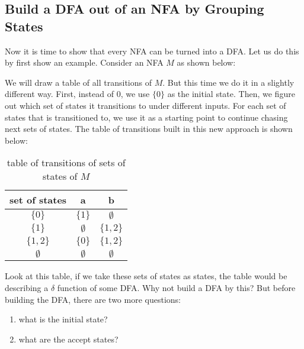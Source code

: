 \documentclass[11pt]{article}
\begin{document}
\subsection{Build a DFA out of an NFA by Grouping States} \label{subsec:5.1}

Now it is time to show that every NFA can be turned into a DFA. Let us do this by first
show an example. Consider an NFA $M$ as shown below:

\begin{figure}[ht]
    \centering
    \caption{}
    \label{fig:fig14}
\end{figure}

We will draw a table of all transitions of $M$. But this time we do it in a slightly
different way. First, instead of $0$, we use $\{0\}$ as the initial state. Then, we
figure out which set of states it transitions to under different inputs. For each
set of states that is transitioned to, we use it as a starting point to continue
chasing next sets of states. The table of transitions built in this new approach is
shown below:

\begin{table}[h!]
\centering
\begin{tabular}{|c|c|c|}
\hline
set of states & a & b \\
\hline
$\{0\}$ & $\{1\}$ & $\emptyset$ \\
\hline
$\{1\}$ & $\emptyset$ & $\{1,2\}$ \\
\hline
$\{1,2\}$ & $\{0\}$ & $\{1,2\}$ \\
\hline
$\emptyset$ & $\emptyset$ & $\emptyset$ \\
\hline
\end{tabular}
\caption{table of transitions of sets of states of $M$}
\end{table}

Look at this table, if we take these sets of states as states, the table would be
describing a $\delta$ function of some DFA. Why not build a DFA by this? But before
building the DFA, there are two more questions:
\begin{enumerate}
\item what is the initial state?
\item what are the accept states?
\end{enumerate}
\end{document}
